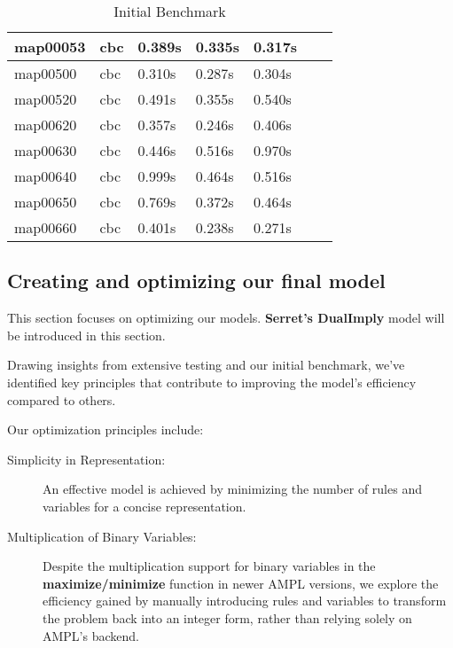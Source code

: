 \begin{table}[H]
\begin{tabular}{|l|l|l|l|l|l|l|}
map00053 & cbc & 0.389s         & 0.335s      & 0.317s       \\\hline
map00500 & cbc & 0.310s          & 0.287s      & 0.304s      \\\hline
map00520 & cbc & 0.491s          & 0.355s       & 0.540s       \\\hline
map00620 & cbc & 0.357s           & 0.246s      & 0.406s       \\\hline
map00630 & cbc & 0.446s          & 0.516s        & 0.970s       \\\hline
map00640 & cbc & 0.999s          & 0.464s       & 0.516s       \\\hline
map00650 & cbc & 0.769s          & 0.372s       & 0.464s       \\\hline
map00660 & cbc & 0.401s          & 0.238s      & 0.271s      \\\hline
\end{tabular}
\caption{Initial Benchmark}
\label{tab:initial_benchmark}
\end{table}

\subsection{Creating and optimizing our final model} \label{sec:model_dualimply_extra_restrictions}

This section focuses on optimizing our models. \textbf{Serret's DualImply} model will be introduced in this section. 

Drawing insights from extensive testing and our initial benchmark, we've identified key principles that contribute to improving the model's efficiency compared to others.

Our optimization principles include:

\begin{description}
    \item[Simplicity in Representation:]
        An effective model is achieved by minimizing the number of rules and variables for a concise representation.

     \item[Multiplication of Binary Variables:]
        Despite the multiplication support for binary variables in the \textbf{maximize/minimize} function in newer AMPL versions, we explore the efficiency gained by manually introducing rules and variables to transform the problem back into an integer form, rather than relying solely on AMPL's backend.
\end{description}

